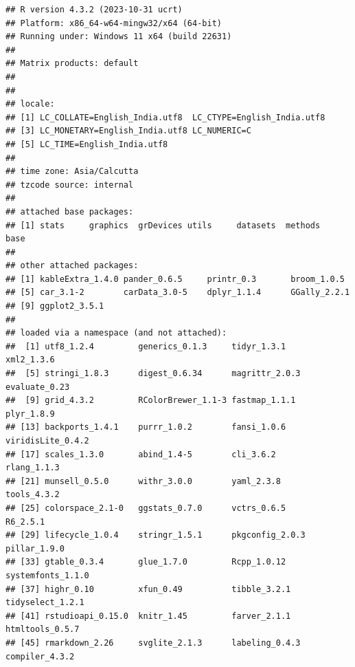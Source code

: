 \documentclass[
]{article}
\begin{document}
\begin{verbatim}
## R version 4.3.2 (2023-10-31 ucrt)
## Platform: x86_64-w64-mingw32/x64 (64-bit)
## Running under: Windows 11 x64 (build 22631)
## 
## Matrix products: default
## 
## 
## locale:
## [1] LC_COLLATE=English_India.utf8  LC_CTYPE=English_India.utf8   
## [3] LC_MONETARY=English_India.utf8 LC_NUMERIC=C                  
## [5] LC_TIME=English_India.utf8    
## 
## time zone: Asia/Calcutta
## tzcode source: internal
## 
## attached base packages:
## [1] stats     graphics  grDevices utils     datasets  methods   base     
## 
## other attached packages:
## [1] kableExtra_1.4.0 pander_0.6.5     printr_0.3       broom_1.0.5     
## [5] car_3.1-2        carData_3.0-5    dplyr_1.1.4      GGally_2.2.1    
## [9] ggplot2_3.5.1   
## 
## loaded via a namespace (and not attached):
##  [1] utf8_1.2.4         generics_0.1.3     tidyr_1.3.1        xml2_1.3.6        
##  [5] stringi_1.8.3      digest_0.6.34      magrittr_2.0.3     evaluate_0.23     
##  [9] grid_4.3.2         RColorBrewer_1.1-3 fastmap_1.1.1      plyr_1.8.9        
## [13] backports_1.4.1    purrr_1.0.2        fansi_1.0.6        viridisLite_0.4.2 
## [17] scales_1.3.0       abind_1.4-5        cli_3.6.2          rlang_1.1.3       
## [21] munsell_0.5.0      withr_3.0.0        yaml_2.3.8         tools_4.3.2       
## [25] colorspace_2.1-0   ggstats_0.7.0      vctrs_0.6.5        R6_2.5.1          
## [29] lifecycle_1.0.4    stringr_1.5.1      pkgconfig_2.0.3    pillar_1.9.0      
## [33] gtable_0.3.4       glue_1.7.0         Rcpp_1.0.12        systemfonts_1.1.0 
## [37] highr_0.10         xfun_0.49          tibble_3.2.1       tidyselect_1.2.1  
## [41] rstudioapi_0.15.0  knitr_1.45         farver_2.1.1       htmltools_0.5.7   
## [45] rmarkdown_2.26     svglite_2.1.3      labeling_0.4.3     compiler_4.3.2
\end{verbatim}
\end{document}
